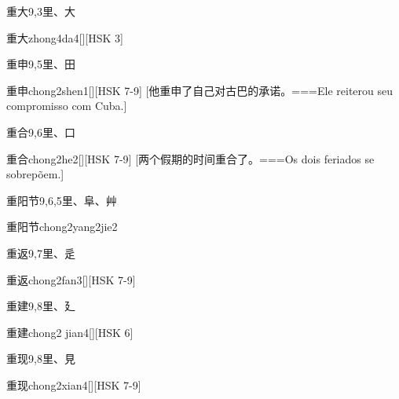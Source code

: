 \begin{Entry}{重大}{9,3}{⾥、⼤}
  \begin{Phonetics}{重大}{zhong4da4}[][HSK 3]
  \end{Phonetics}
\end{Entry}

\begin{Entry}{重申}{9,5}{⾥、⽥}
  \begin{Phonetics}{重申}{chong2shen1}[][HSK 7-9]
    [他重申了自己对古巴的承诺。===Ele reiterou seu compromisso com Cuba.]
  \end{Phonetics}
\end{Entry}

\begin{Entry}{重合}{9,6}{⾥、⼝}
  \begin{Phonetics}{重合}{chong2he2}[][HSK 7-9]
    [两个假期的时间重合了。===Os dois feriados se sobrepõem.]
  \end{Phonetics}
\end{Entry}

\begin{Entry}{重阳节}{9,6,5}{⾥、⾩、⾋}
  \begin{Phonetics}{重阳节}{chong2yang2jie2}
  \end{Phonetics}
\end{Entry}

\begin{Entry}{重返}{9,7}{⾥、⾡}
  \begin{Phonetics}{重返}{chong2fan3}[][HSK 7-9]
  \end{Phonetics}
\end{Entry}

\begin{Entry}{重建}{9,8}{⾥、⼵}
  \begin{Phonetics}{重建}{chong2 jian4}[][HSK 6]
  \end{Phonetics}
\end{Entry}

\begin{Entry}{重现}{9,8}{⾥、⾒}
  \begin{Phonetics}{重现}{chong2xian4}[][HSK 7-9]
  \end{Phonetics}
\end{Entry}

